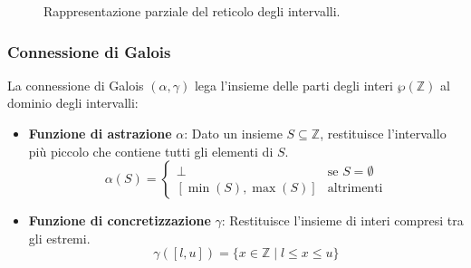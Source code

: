 \begin{figure}[H]
    \centering
    \caption{Rappresentazione parziale del reticolo degli intervalli.}
    \label{fig:interval_lattice}
\end{figure}



\subsubsection{Connessione di Galois}

La connessione di Galois $(\alpha, \gamma)$ lega l'insieme delle parti
degli interi $\wp(\mathbb{Z})$ al dominio degli intervalli:

\begin{itemize}
    \item \textbf{Funzione di astrazione} $\alpha$: Dato un insieme
    $S \subseteq \mathbb{Z}$, restituisce l'intervallo più piccolo che
    contiene tutti gli elementi di $S$.
    \[
    \alpha(S) =
    \begin{cases}
        \bot & \text{se } S = \emptyset \\
        [\min(S), \max(S)] & \text{altrimenti}
    \end{cases}
    \]
    \item \textbf{Funzione di concretizzazione} $\gamma$: Restituisce
    l'insieme di interi compresi tra gli estremi.
    \[
    \gamma([l, u]) = \{ x \in \mathbb{Z} \mid l \leq x \leq u \}
    \]
\end{itemize}

